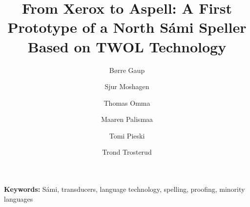 
\title{From Xerox to Aspell: A First Prototype of a North S\'{a}mi Speller
 Based on TWOL Technology}

\author{B{\o}rre Gaup 
        \and Sjur Moshagen
        \and Thomas Omma 
        \and Maaren Palismaa
        \and Tomi Pieski
        \and Trond Trosterud}



\maketitle

\textbf{Keywords:} S\'{a}mi, transducers, language technology, spelling,
 proofing, minority languages

